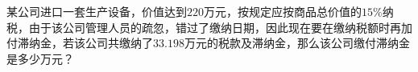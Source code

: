 某公司进口一套生产设备，价值达到$220$万元，按规定应按商品总价值的$15\%$纳税，由于该公司管理人员的疏忽，错过了缴纳日期，因此现在要在缴纳税额时再加付滞纳金，若该公司共缴纳了$33.198$万元的税款及滞纳金，那么该公司缴付滞纳金是多少万元？
